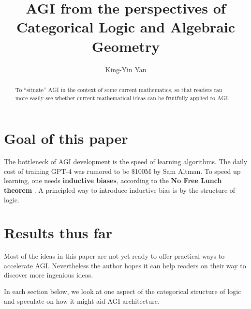 \documentclass[runningheads]{llncs}
\begin{document}
%
\title{AGI from the perspectives of Categorical Logic and Algebraic Geometry}
%
%
\author{King-Yin Yan }
%
%
%
\maketitle              %
%
\begin{abstract}
To ``situate'' AGI in the context of some current mathematics, so that readers can more easily see whether current mathematical ideas can be fruitfully applied to AGI.

\end{abstract}
%
%
%
\section{Goal of this paper}

The bottleneck of AGI development is the speed of learning algorithms.  The daily cost of training GPT-4 was rumored to be \$100M by Sam Altman.  To speed up learning, one needs \textbf{inductive biases}, according to the \textbf{No Free Lunch theorem} \cite{Wolpert1997} \cite{Wikipedia-no-free-lunch}.  A principled way to introduce inductive bias is by the structure of logic. 

\section{Results thus far}

Most of the ideas in this paper are not yet ready to offer practical ways to accelerate AGI.  Nevertheless the author hopes it can help readers on their way to discover more ingenious ideas.

In each section below, we look at one aspect of the categorical structure of logic and speculate on how it might aid AGI architecture.
\end{document}
